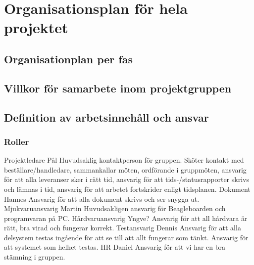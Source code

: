 \section{Organisationsplan för hela projektet}

\subsection{Organisationplan per fas}

\subsection{Villkor för samarbete inom projektgruppen}

\subsection{Definition av arbetsinnehåll och ansvar}


\subsubsection{Roller}
Projektledare	Pål
	Huvudsaklig kontaktperson för gruppen. Sköter kontakt med beställare/handledare, sammankallar möten, ordförande i gruppmöten, ansvarig för att alla leveranser sker i rätt tid, ansvarig för att tids-/statusrapporter skrivs och lämnas i tid, ansvarig för att arbetet fortskrider enligt tidsplanen.
Dokument	Hannes
	Ansvarig för att alla dokument skrivs och ser snygga ut. 
Mjukvaruansvarig	Martin
	Huvudsakligen ansvarig för Beagleboarden och programvaran på PC.
Hårdvaruansvarig	Yngve?
	Ansvarig för att all hårdvara är rätt, bra virad och fungerar korrekt.
Testansvarig	Dennis
	Ansvarig för att alla delsystem testas ingående för att se till att allt fungerar som tänkt. Ansvarig för att systemet som helhet testas.
HR	Daniel
	Ansvarig för att vi har en bra stämning i gruppen.